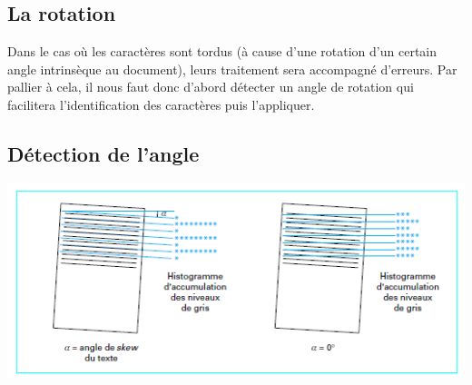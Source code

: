 \documentclass [french,12pt]{article}
\begin{document}
\subsection{La rotation}

Dans le cas où les caractères sont tordus  (à cause d'une rotation d'un certain angle intrinsèque au document), leurs traitement sera accompagné d'erreurs. Par pallier à cela, il nous faut donc d'abord détecter un angle de rotation qui facilitera l'identification des caractères puis l'appliquer.

\subsection{Détection de l'angle}

\begin{center} \includegraphics[scale=1.00]{rotation_arnaud} \end{center}
\\
\end{document}
